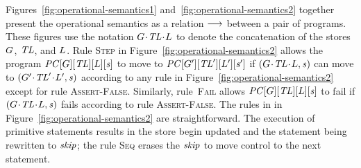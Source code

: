 Figures~\ref{fig:operational-semantics1} and~\ref{fig:operational-semantics2} together present the operational semantics as a relation $\longrightarrow$ between a pair of programs.
These figures use the notation ${G}\!\cdot\!{\mathit{TL}}\!\cdot\!{L}$ to denote the concatenation of the stores $G$, $\mathit{TL}$, and $L$.
Rule \textsc{Step} in Figure~\ref{fig:operational-semantics2} allows the program $\mathit{PC}[G][\mathit{TL}][L][\mathit{s}]$ to move 
to $\mathit{PC}[G'][\mathit{TL}'][L'][\mathit{s}']$
if $({G}\!\cdot\!{\mathit{TL}}\!\cdot\!{L}, \mathit{s})$ can move to $({G'}\!\cdot\!{\mathit{TL}'}\!\cdot\!{L'}, \mathit{s})$ 
according to any rule in Figure~\ref{fig:operational-semantics2} except for rule \textsc{Assert-False}.
Similarly, rule~\textsc{Fail} allows $\mathit{PC}[G][\mathit{TL}][L][\mathit{s}]$ to fail if $({G}\!\cdot\!{\mathit{TL}}\!\cdot\!{L}, \mathit{s})$
fails according to rule \textsc{Assert-False}. 
The rules in  in Figure~\ref{fig:operational-semantics2} are straightforward.
The execution of primitive statements results in the store begin updated and the statement being rewritten to $\mathit{skip}$;
the rule \textsc{Seq} erases the $\mathit{skip}$ to move control to the next statement.





